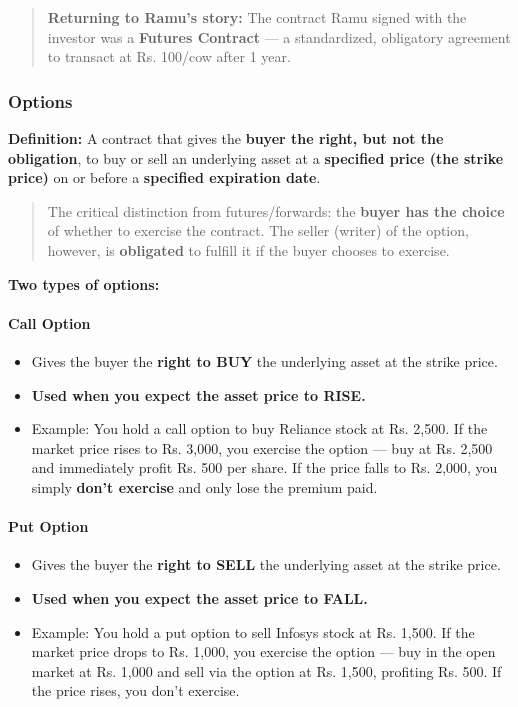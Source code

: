 \documentclass[12pt,openany]{book}
\begin{document}
\begin{quote}
    \textbf{Returning to Ramu's story:} The contract Ramu signed with the investor was a \textbf{Futures Contract} --- a standardized, obligatory agreement to transact at Rs. 100/cow after 1 year.
\end{quote}

\subsubsection{Options}

\textbf{Definition:} A contract that gives the \textbf{buyer the right, but not the obligation}, to buy or sell an underlying asset at a \textbf{specified price (the strike price)} on or before a \textbf{specified expiration date}.

\begin{quote}
    The critical distinction from futures/forwards: the \textbf{buyer has the choice} of whether to exercise the contract. The seller (writer) of the option, however, is \textbf{obligated} to fulfill it if the buyer chooses to exercise.
\end{quote}

\textbf{Two types of options:}

\paragraph{Call Option}

\begin{itemize}[leftmargin=*]
    \item Gives the buyer the \textbf{right to BUY} the underlying asset at the strike price.
    \item \textbf{Used when you expect the asset price to RISE.}
    \item Example: You hold a call option to buy Reliance stock at Rs. 2,500. If the market price rises to Rs. 3,000, you exercise the option --- buy at Rs. 2,500 and immediately profit Rs. 500 per share. If the price falls to Rs. 2,000, you simply \textbf{don't exercise} and only lose the premium paid.
\end{itemize}

\paragraph{Put Option}

\begin{itemize}[leftmargin=*]
    \item Gives the buyer the \textbf{right to SELL} the underlying asset at the strike price.
    \item \textbf{Used when you expect the asset price to FALL.}
    \item Example: You hold a put option to sell Infosys stock at Rs. 1,500. If the market price drops to Rs. 1,000, you exercise the option --- buy in the open market at Rs. 1,000 and sell via the option at Rs. 1,500, profiting Rs. 500. If the price rises, you don't exercise.
\end{itemize}
\end{document}
